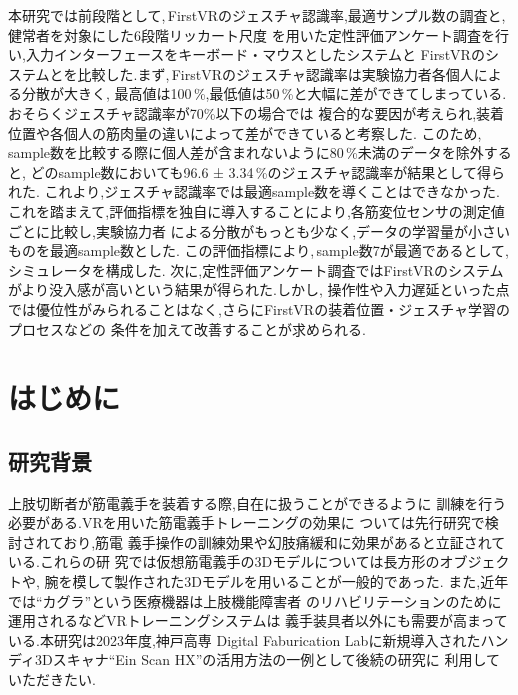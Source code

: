 \documentclass{ltjsreport}
\begin{document}
本研究では前段階として,\,FirstVRのジェスチャ認識率,最適サンプル数の調査と,健常者を対象にした6段階リッカート尺度
を用いた定性評価アンケート調査を行い,入力インターフェースをキーボード・マウスとしたシステムと
FirstVRのシステムとを比較した.まず,\,FirstVRのジェスチャ認識率は実験協力者各個人による分散が大きく,
最高値は100\,\%,最低値は50\,\%と大幅に差ができてしまっている.おそらくジェスチャ認識率が70\%以下の場合では
複合的な要因が考えられ,装着位置や各個人の筋肉量の違いによって差ができていると考察した.
このため,\,sample数を比較する際に個人差が含まれないように80\,\%未満のデータを除外すると,
どのsample数においても96.6 ± 3.34\,\%のジェスチャ認識率が結果として得られた.
これより,ジェスチャ認識率では最適sample数を導くことはできなかった.
これを踏まえて,評価指標を独自に導入することにより,各筋変位センサの測定値ごとに比較し,実験協力者
による分散がもっとも少なく,データの学習量が小さいものを最適sample数とした.
この評価指標により,\,sample数7が最適であるとして,シミュレータを構成した.
次に,定性評価アンケート調査ではFirstVRのシステムがより没入感が高いという結果が得られた.しかし,
操作性や入力遅延といった点では優位性がみられることはなく,さらにFirstVRの装着位置・ジェスチャ学習のプロセスなどの
条件を加えて改善することが求められる.
\clearpage

\setcounter{tocdepth}{2}
\tableofcontents

\clearpage


\chapter{はじめに}
	\section{研究背景}
		上肢切断者が筋電義手を装着する際,自在に扱うことができるように
		訓練を行う必要がある.VRを用いた筋電義手トレーニングの効果に
		ついては先行研究\cite{ref:1}\cite{ref:2}で検討されており,筋電
		義手操作の訓練効果や幻肢痛緩和に効果があると立証されている.これらの研
		究では仮想筋電義手の3Dモデルについては長方形のオブジェクトや,
		腕を模して製作された3Dモデルを用いることが一般的であった.
		また,近年では``カグラ''\cite{ref:3}という医療機器は上肢機能障害者
		のリハビリテーションのために運用されるなどVRトレーニングシステムは
		義手装具者以外にも需要が高まっている.本研究は2023年度,神戸高専
		Digital Faburication Labに新規導入されたハンディ3Dスキャナ``Ein Scan HX''\cite{ref:4}の活用方法の一例として後続の研究に
		利用していただきたい.
\end{document}
